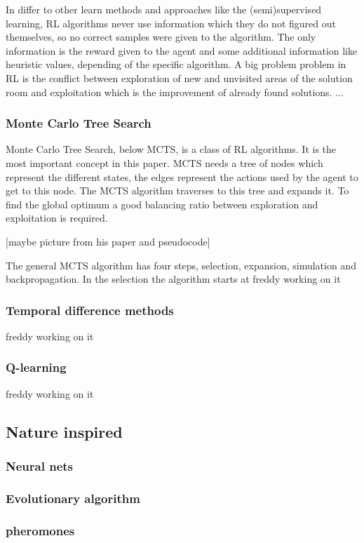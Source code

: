 In differ to other learn methods and approaches like the (semi)supervised learning, RL algorithms never use information which they do not figured out themselves, so no correct samples were given to the algorithm. The only information is the reward given to the agent and some additional information like heuristic values, depending of the specific algorithm. 
A big problem problem in RL is the conflict between exploration of new and unvisited areas of the solution room and exploitation which is the improvement of already found solutions.
...
\subsubsection{Monte Carlo Tree Search} 

Monte Carlo Tree Search, below MCTS, is a class of RL algorithms. It is the most important concept in this paper. MCTS needs a tree of nodes which represent the different states, the edges represent the actions used by the agent to get to this node. The MCTS algorithm traverses to this tree and expands it. To find the global optimum a good balancing ratio between exploration and exploitation is required. 

[maybe picture from his paper and pseudocode]

The general MCTS algorithm has four steps, selection, expansion, simulation and backpropagation. In the selection the algorithm starts at  
freddy working on it 
\subsubsection{Temporal difference methods} 
freddy working on it
\subsubsection{Q-learning} 
freddy working on it

\subsection{Nature inspired} 

\subsubsection{Neural nets} 
\subsubsection{Evolutionary algorithm} 
\subsubsection{pheromones} 



